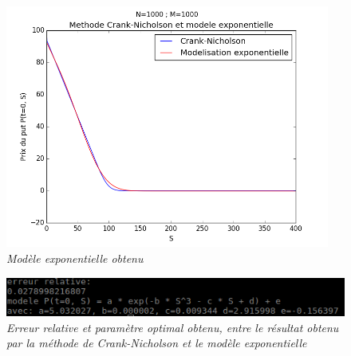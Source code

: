 \documentclass[10pt]{article}
\begin{document}
  \begin{figure}[H]
    \begin{center}
      \includegraphics[height=8cm,keepaspectratio]{./images/modele_exp.png}
    \end{center}
    \caption{\textit{Modèle exponentielle obtenu}}
    \label{modele_exp}
  \end{figure}
  
  \begin{figure}[H]
    \begin{center}
      \includegraphics[width=12cm,keepaspectratio]{./images/modele_exp_vars.png}
    \end{center}
    \caption{\textit{Erreur relative et paramètre optimal obtenu, entre le résultat obtenu par la méthode de Crank-Nicholson et le modèle exponentielle}}
    \label{modele_exp_vars}
  \end{figure}
  
  \newpage
  
\end{document}
